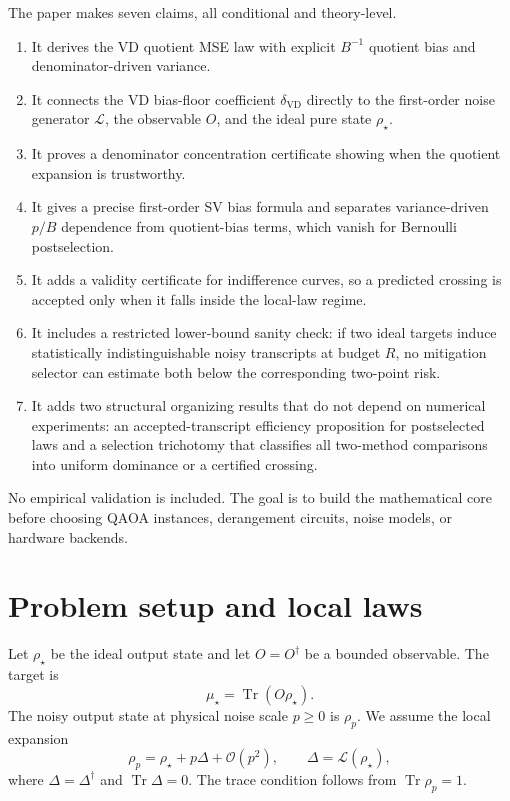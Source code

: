 \documentclass[11pt]{article}
\DeclareMathOperator{\Tr}{Tr}
\newcommand{\1}{\mathbf{1}}
\newcommand{\OO}{\mathcal{O}}
\begin{document}
The paper makes seven claims, all conditional and theory-level.
\begin{enumerate}[leftmargin=2em]
    \item It derives the VD quotient MSE law with explicit \(B^{-1}\) quotient bias and denominator-driven variance.
    \item It connects the VD bias-floor coefficient \(\delta_{\mathrm{VD}}\) directly to the first-order noise generator \(\mathcal L\), the observable \(O\), and the ideal pure state \(\rho_\star\).
    \item It proves a denominator concentration certificate showing when the quotient expansion is trustworthy.
    \item It gives a precise first-order SV bias formula and separates variance-driven \(p/B\) dependence from quotient-bias terms, which vanish for Bernoulli postselection.
    \item It adds a validity certificate for indifference curves, so a predicted crossing is accepted only when it falls inside the local-law regime.
    \item It includes a restricted lower-bound sanity check: if two ideal targets induce statistically indistinguishable noisy transcripts at budget \(R\), no mitigation selector can estimate both below the corresponding two-point risk.
    \item It adds two structural organizing results that do not depend on numerical experiments: an accepted-transcript efficiency proposition for postselected laws and a selection trichotomy that classifies all two-method comparisons into uniform dominance or a certified crossing.
\end{enumerate}

No empirical validation is included.  The goal is to build the mathematical core before choosing QAOA instances, derangement circuits, noise models, or hardware backends.

\section{Problem setup and local laws}

Let \(\rho_\star\) be the ideal output state and let \(O=O^\dagger\) be a bounded observable.  The target is
\begin{equation}
    \mu_\star=\Tr(O\rho_\star).
\end{equation}
The noisy output state at physical noise scale \(p\geq0\) is \(\rho_p\).  We assume the local expansion
\begin{equation}
    \rho_p=\rho_\star+p\Delta+\OO(p^2),
    \qquad
    \Delta=\mathcal L(\rho_\star),
    \label{eq:noise_expansion}
\end{equation}
where \(\Delta=\Delta^\dagger\) and \(\Tr\Delta=0\).  The trace condition follows from \(\Tr\rho_p=1\).
\end{document}
